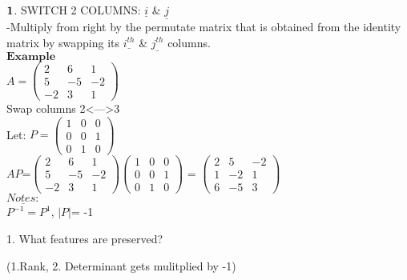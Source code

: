 \documentclass[]{article}
\begin{document}
\(\bold{1}\). SWITCH 2 COLUMNS: \(\underline{i}\) \& \(\underline{j}\)\\
 -Multiply from right by the permutate matrix that is obtained from the
identity matrix by swapping its \(\underline{i^{th}}\) \&
\(\underline{j^{th}}\) columns.\\

\(\mathbf{Example}\)\\

\(A =\begin{pmatrix} 2 & 6 & 1\\ 5 & -5 & -2 \\ -2 & 3 & 1 \end{pmatrix}\)\\

Swap columns 2\textless{}---\textgreater{}3\\

Let:
\(P =\begin{pmatrix} 1 & 0 & 0\\ 0 & 0 & 1 \\ 0 & 1 & 0 \end{pmatrix}\)\\

\(AP\)=\(\begin{pmatrix} 2 & 6 & 1\\ 5 & -5 & -2 \\ -2 & 3 & 1 \end{pmatrix}\begin{pmatrix} 1 & 0 & 0\\ 0 & 0 & 1 \\ 0 & 1 & 0 \end{pmatrix}\)
=
\(\begin{pmatrix} 2 & 5 & -2\\ 1 & -2 & 1 \\ 6 & -5 & 3 \end{pmatrix}\)\\

\(\underline{Notes:}\)\\

\(P^{-1}=P^{1}\), \(|P|\)= -1\\

\begin{tcolorbox}[colback=yellow!5,colframe=yellow!40!black,title=Question]
1. What features are preserved?

(1.Rank, 2. Determinant gets mulitplied by -1)

\end{tcolorbox}
\end{document}
